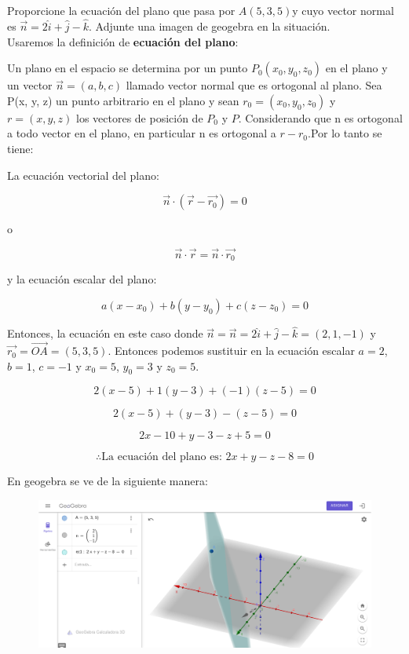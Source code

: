 \documentclass[12pt]{article}
\begin{document}
\section{}

Proporcione la ecuación del plano que pasa por $A(5,3,5)$y cuyo vector normal es $\vec{n}=2\hat{i} + \hat{j} - \hat{k}$. Adjunte una imagen de geogebra en la situación. \\

Usaremos la definición de \textbf{ecuación del plano}:

Un plano en el espacio se determina por un punto $P_0(x_0, y_0, z_0)$ en el plano y un vector $\vec{n}=(a,b,c)$ llamado vector normal que es ortogonal al plano. Sea P(x, y, z) un punto arbitrario en el plano y sean $r_0 = (x_0, y_0, z_0)$ y $r = (x, y,z)$ los vectores de posición de $P_0$ y $P$. Considerando que n es ortogonal a todo vector en el plano, en particular n es ortogonal a $r-r_0$.Por lo tanto se tiene:

La ecuación vectorial del plano:

\[
\vec{n} \cdot (\vec{r} - \vec{r_0}) = 0
\]

o

\[
\vec{n} \cdot \vec{r} = \vec{n} \cdot \vec{r_0}
\]

y la ecuación escalar del plano:

\[
a(x-x_0) + b(y-y_0)+c(z-z_0) = 0
\]

Entonces, la ecuación en este caso donde $\vec{n} = \vec{n}=2\hat{i} + \hat{j} - \hat{k} = (2, 1, -1)$ y $\vec{r_0}= \vec{OA} = (5,3,5)$. Entonces podemos sustituir en la ecuación escalar $a=2$, $b=1$, $c=-1$ y $x_0=5$, $y_0=3$ y $z_0=5$.

\[
2(x-5) + 1(y-3)+(-1)(z-5) = 0
\]

\[
2(x-5) +(y-3)-(z-5) = 0
\]

\[
2x-10 +y-3-z+5 = 0
\]

\[
\therefore \text{La ecuación del plano es: } 2x+y-z-8 = 0
\]

En geogebra se ve de la siguiente manera:

\begin{figure}[H]
  \centering
  \includegraphics[width=1\textwidth]{./img/planoEc.png}
\end{figure}
\end{document}
